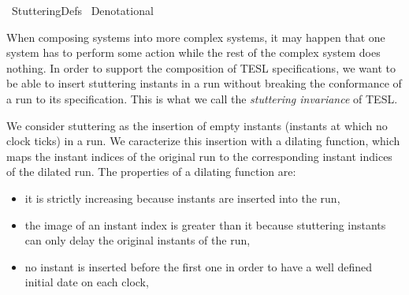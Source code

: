%
\begin{isabellebody}%
%
%
\isadelimdocument
%
\endisadelimdocument
%
\isatagdocument
%
\isamarkuptrue%
%
\isamarkuptrue%
%
\endisatagdocument
{\isafolddocument}%
%
\isadelimdocument
%
\endisadelimdocument
%
\isadelimtheory
%
\endisadelimtheory
%
\isatagtheory
{}\isamarkupfalse%
\ StutteringDefs\isanewline
\isanewline
{}\ Denotational\isanewline
\isanewline
{}%
\endisatagtheory
{\isafoldtheory}%
%
\isadelimtheory
%
\endisadelimtheory
%
\begin{isamarkuptext}%
When composing systems into more complex systems, it may happen that one system 
  has to perform some action while the rest of the complex system does nothing.
  In order to support the composition of TESL specifications, we want to be able 
  to insert stuttering instants in a run without breaking the conformance of a run 
  to its specification. This is what we call the \emph{stuttering invariance} of TESL.%
\end{isamarkuptext}\isamarkuptrue%
%
\isadelimdocument
%
\endisadelimdocument
%
\isatagdocument
%
\isamarkuptrue%
%
\endisatagdocument
{\isafolddocument}%
%
\isadelimdocument
%
\endisadelimdocument
%
\begin{isamarkuptext}%
We consider stuttering as the insertion of empty instants (instants at which no 
clock ticks) in a run. We caracterize this insertion with a dilating function,
which maps the instant indices of the original run to the corresponding instant
indices of the dilated run.
The properties of a dilating function are:

%
\begin{itemize}%
\item it is strictly increasing because instants are inserted into the run,

\item the image of an instant index is greater than it because stuttering instants 
can only delay the original instants of the run, 

\item no instant is inserted before the first one in order to have a well defined 
initial date on each clock,


\end{itemize}
\end{isamarkuptext}
\end{isabellebody}
